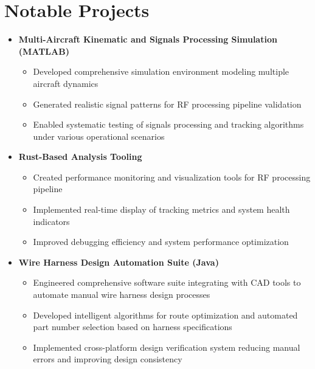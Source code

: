 \documentclass[letterpaper,11pt]{article}
\newcommand{\resumeItem}[1]{
  \item\small{
    {#1 \vspace{-2pt}}
  }
}
\begin{document}
\section{Notable Projects}
\begin{itemize}[leftmargin=0.15in, label={}]
    \item \textbf{Multi-Aircraft Kinematic and Signals Processing Simulation (MATLAB)}
    \begin{itemize}[leftmargin=0.15in]
        \resumeItem{Developed comprehensive simulation environment modeling multiple aircraft dynamics}
        \resumeItem{Generated realistic signal patterns for RF processing pipeline validation}
        \resumeItem{Enabled systematic testing of signals processing and tracking algorithms under various operational scenarios}
    \end{itemize}
    
    \item \textbf{Rust-Based Analysis Tooling}
    \begin{itemize}[leftmargin=0.15in]
        \resumeItem{Created performance monitoring and visualization tools for RF processing pipeline}
        \resumeItem{Implemented real-time display of tracking metrics and system health indicators}
        \resumeItem{Improved debugging efficiency and system performance optimization}
    \end{itemize}

    \item \textbf{Wire Harness Design Automation Suite (Java)}
    \begin{itemize}[leftmargin=0.15in]
        \resumeItem{Engineered comprehensive software suite integrating with CAD tools to automate manual wire harness design processes}
        \resumeItem{Developed intelligent algorithms for route optimization and automated part number selection based on harness specifications}
        \resumeItem{Implemented cross-platform design verification system reducing manual errors and improving design consistency}
    \end{itemize}
\end{itemize}


\end{document}
